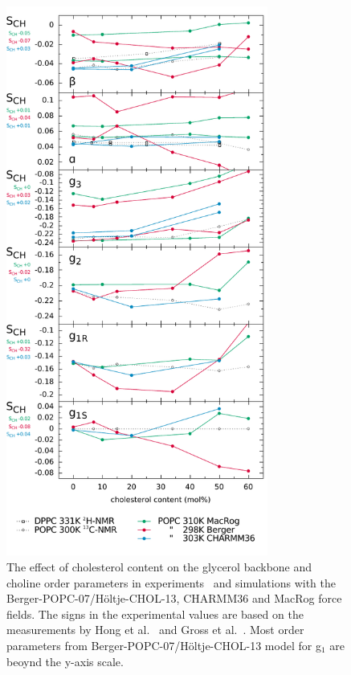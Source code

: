 \documentclass[pre,aps,floatfix,authordate1-4,twocolumn]{revtex4-1}
\begin{document}
\begin{figure}[]
  \centering
  \includegraphics[width=8.6cm]{../DATAreportediINblog/cholesterolization.pdf}
  \caption{\label{ordPchol}
    The effect of cholesterol content on the glycerol backbone and choline order parameters in experiments~\cite{brown78,ferreira13} and simulations
    with the Berger-POPC-07/H\"oltje-CHOL-13, CHARMM36 and MacRog force fields. The signs in the experimental values are based on the measurements by Hong et al.~\cite{hong95a,hong95b} 
    and Gross et al.~\cite{gross97}.  Most order parameters from Berger-POPC-07/H\"oltje-CHOL-13 model for g$_1$ are beoynd the y-axis scale.}
\end{figure}
\end{document}

